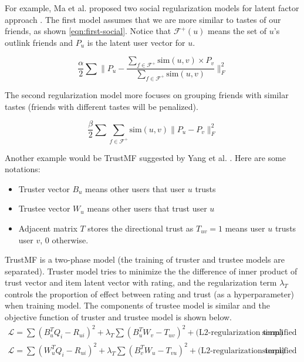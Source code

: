 \documentclass[letter paper, 11pt]{article}
\begin{document}
	For example, Ma et al. proposed two social regularization models for latent factor approach \cite{social-regularization}. The first model assumes that we are more similar to tastes of our friends, as shown \ref{eqn:first-social}. Notice that $\mathcal{F}^+(u)$ means the set of $u$'s outlink friends and $P_u$ is the latent user vector for $u$.
	
	\begin{equation}
		\label{eqn:first-social}
		\tag*{First Regularization Model}
		\dfrac{\alpha}{2} \sum \|P_u - \dfrac{\sum_{f \in \mathcal{F}^+} \text{sim}(u, v) \times P_v }{\sum_{f \in \mathcal{F}^+} \text{sim}(u, v)} \|_F^2
	\end{equation} 
	
	The second regularization model more focuses on grouping friends with similar tastes (friends with different tastes will be penalized).

	\begin{equation}
		\label{eqn:sec-social}
		\tag*{Second Regularization Model}
		\dfrac{\beta}{2} \sum \sum_{f \in \mathcal{F}^+} \text{sim}(u, v) \|P_u - P_v\|_F^2
	\end{equation}
	
	Another example would be TrustMF suggested by Yang et al. \cite{TrustMF}. Here are some notations:
	\begin{itemize}
		\item Truster vector $B_u$ means other users that user $u$ trusts
		
		\item Trustee vector $W_u$ means other users that trust user $u$
		
		\item Adjacent matrix $T$ stores the directional trust as $T_{uv} = 1$ means user $u$ trusts user $v$, 0 otherwise.
	\end{itemize}
	
	TrustMF is a two-phase model (the training of truster and trustee models are separated). Truster model tries to minimize the the difference of inner product of trust vector and item latent vector with rating, and the regularization term $\lambda_T$ controls the proportion of effect between rating and trust (as a hyperparameter) when training
	model. The components of trustee model is similar and the objective function of truster and trustee model is shown below.
	\begin{equation}
		\begin{split}
			\mathcal{L} = \sum (B_u^T Q_i - R_{ui})^2 + \lambda_T \sum (B_u^T W_v - T_{uv})^2 + \text{(L2-regularization term)} & \quad \text{simplified truster model} \\
			\mathcal{L} = \sum (W_u^T Q_i - R_{ui})^2 + \lambda_T \sum (B_v^T W_u - T_{vu})^2 + \text{(L2-regularization term)} & \quad \text{simplified trustee model} 
		\end{split}		
	\end{equation}
\end{document}
